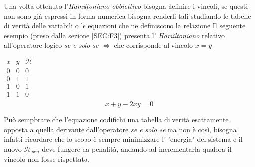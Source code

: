 \documentclass[a4paper]{article}
\begin{document}
Una volta ottenuto l'\textit{Hamiltoniano obbiettivo} bisogna definire i vincoli, se questi non sono già espressi in forma numerica bisogna renderli tali studiando le tabelle di verità delle variabili o le equazioni che ne definiscono la relazione
Il seguente esempio (preso dalla sezione \ref{SEC:F3}) presenta l' \textit{Hamiltoniano} relativo all'operatore logico \textit{se e solo se} $ \Leftrightarrow$ che corrisponde al vincolo $x=y$ 
\begin{center}$\begin{array}{c|c|c}
 x & y & \mathcal{H}\\
\hline
 0 & 0 & 0  \\
 0 & 1 & 1  \\
 1 & 0 & 1  \\
 1 & 1 & 0  \\ %
\end{array}$
$$ x + y -2xy = 0$$
\end{center}
Può sempbrare che l'equazione codifichi una tabella di verità esattamente opposta a quella derivante dall'operatore \textit{se e solo se} ma non è così, bisogna infatti ricordare che lo scopo è sempre minimizzare l' "energia" del sistema e il nuovo $\mathcal{H}_{pen}$ deve fungere da penalità, andando ad incrementarla qualora il vincolo non fosse rispettato.
\end{document}

